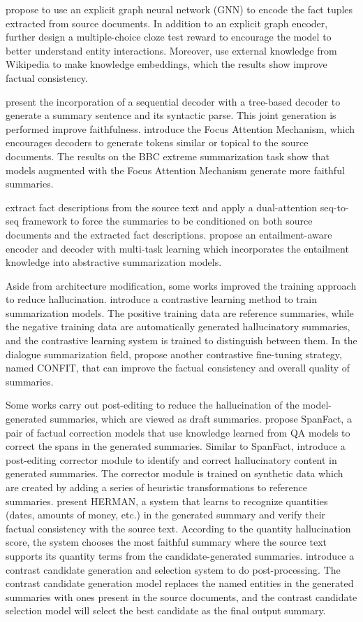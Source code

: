  propose to use an explicit graph neural network (GNN) to encode the fact tuples extracted from source documents. In addition to an explicit graph encoder,  further design a multiple-choice cloze test reward to encourage the model to better understand entity interactions. Moreover,  use external knowledge from Wikipedia to make knowledge embeddings, which the results show improve factual consistency.

 present the incorporation of a sequential decoder with a tree-based decoder to generate a summary sentence and its syntactic parse. This joint generation is performed improve faithfulness.  introduce the Focus Attention Mechanism, which encourages decoders to generate tokens similar or topical to the source documents. The results on the BBC extreme summarization task show that models augmented with the Focus Attention Mechanism generate more faithful summaries.

 extract fact descriptions from the source text and apply a dual-attention seq-to-seq framework to force the summaries to be conditioned on both source documents and the extracted fact descriptions.  propose an entailment-aware encoder and decoder with multi-task learning which incorporates the entailment knowledge into abstractive summarization models.

Aside from architecture modification, some works improved the training approach to reduce hallucination.  introduce a contrastive learning method to train summarization models. The positive training data are reference summaries, while the negative training data are automatically generated hallucinatory summaries, and the contrastive learning system is trained to distinguish between them. In the dialogue summarization field,  propose another contrastive fine-tuning strategy, named CONFIT, that can improve the factual consistency and overall quality of summaries.

Some works carry out post-editing to reduce the hallucination of the model-generated summaries, which are viewed as draft summaries.  propose SpanFact, a pair of factual correction models that use knowledge learned from QA models to correct the spans in the generated summaries. Similar to SpanFact,  introduce a post-editing corrector module to identify and correct hallucinatory content in generated summaries. The corrector module is trained on synthetic data which are created by adding a series of heuristic transformations to reference summaries.
 present HERMAN, a system that learns to recognize quantities (dates, amounts of money, etc.) in the generated summary and verify their factual consistency with the source text. According to the quantity hallucination score, the system chooses the most faithful summary where the source text supports its quantity terms from the candidate-generated summaries.  introduce a contrast candidate generation and selection system to do post-processing. The contrast candidate generation model replaces the named entities in the generated summaries with ones present in the source documents, and the contrast candidate selection model will select the best candidate as the final output summary.



